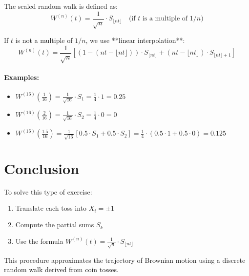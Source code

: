 The scaled random walk is defined as:
\[
W^{(n)}(t) = \frac{1}{\sqrt{n}} \cdot S_{\lfloor nt \rfloor}
\quad \text{(if $t$ is a multiple of $1/n$)}
\]

If \( t \) is not a multiple of \( 1/n \), we use **linear interpolation**:
\[
W^{(n)}(t) = \frac{1}{\sqrt{n}} \left[ (1 - (nt - \lfloor nt \rfloor)) \cdot S_{\lfloor nt \rfloor} + (nt - \lfloor nt \rfloor) \cdot S_{\lfloor nt \rfloor + 1} \right]
\]

\paragraph{Examples:}
\begin{itemize}
\item \( \displaystyle W^{(16)}\left(\frac{1}{16}\right) = \frac{1}{\sqrt{16}} \cdot S_1 = \frac{1}{4} \cdot 1 = 0.25 \)
\item \( \displaystyle W^{(16)}\left(\frac{2}{16}\right) = \frac{1}{\sqrt{16}} \cdot S_2 = \frac{1}{4} \cdot 0 = 0 \)
\item \( \displaystyle W^{(16)}\left(\frac{1.5}{16}\right) = \frac{1}{\sqrt{16}} \left[ 0.5 \cdot S_1 + 0.5 \cdot S_2 \right] = \frac{1}{4} \cdot (0.5 \cdot 1 + 0.5 \cdot 0) = 0.125 \)
\end{itemize}

\section*{Conclusion}

To solve this type of exercise:

\begin{enumerate}
    \item Translate each toss into \( X_i = \pm 1 \)
    \item Compute the partial sums \( S_k \)
    \item Use the formula \( W^{(n)}(t) = \frac{1}{\sqrt{n}} \cdot S_{\lfloor nt \rfloor} \)
\end{enumerate}

This procedure approximates the trajectory of Brownian motion using a discrete random walk derived from coin tosses.